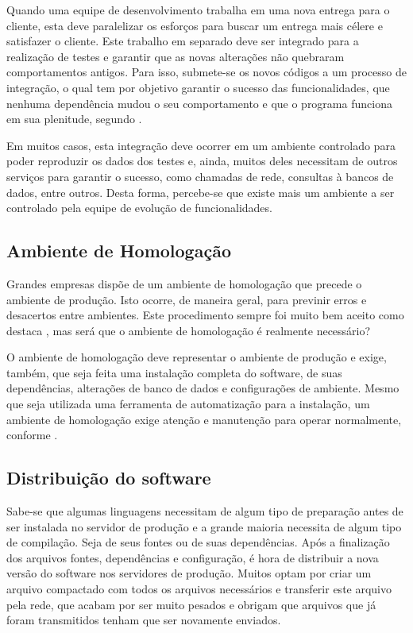\documentclass[
	12pt,				%
	openright,			%
	oneside,			%
	a4paper,			%
	chapter=TITLE,		%
	section=TITLE,		%
	english,			%
	french,				%
	spanish,			%
	brazil				%
	]{abntex2}
\begin{document}
Quando uma equipe de desenvolvimento trabalha em uma nova entrega para o cliente, esta deve paralelizar os esforços para buscar um entrega mais célere e satisfazer o cliente. Este trabalho em separado deve ser integrado para a realização de testes e garantir que as novas alterações não quebraram comportamentos antigos. Para isso, submete-se os novos códigos a um processo de integração, o qual tem por objetivo garantir o sucesso das funcionalidades, que nenhuma dependência mudou o seu comportamento e que o programa funciona em sua plenitude, segundo .

Em muitos casos, esta integração deve ocorrer em um ambiente controlado para poder reproduzir os dados dos testes e, ainda, muitos deles necessitam de outros serviços para garantir o sucesso, como chamadas de rede, consultas à bancos de dados, entre outros. Desta forma, percebe-se que existe mais um ambiente a ser controlado pela equipe de evolução de funcionalidades.

\subsection{Ambiente de Homologação}

Grandes empresas dispõe de um ambiente de homologação que precede o ambiente de produção. Isto ocorre, de maneira geral, para previnir erros e desacertos entre ambientes. Este procedimento sempre foi muito bem aceito como destaca , mas será que o ambiente de homologação é realmente necessário?

O ambiente de homologação deve representar o ambiente de produção e exige, também, que seja feita uma instalação completa do software, de suas dependências, alterações de banco de dados e configurações de ambiente. Mesmo que seja utilizada uma ferramenta de automatização para a instalação, um ambiente de homologação exige atenção e manutenção para operar normalmente, conforme .

\subsection{Distribuição do software}

Sabe-se que algumas linguagens necessitam de algum tipo de preparação antes de ser instalada no servidor de produção e a grande maioria necessita de algum tipo de compilação. Seja de seus fontes ou de suas dependências. Após a finalização dos arquivos fontes, dependências e configuração, é hora de distribuir a nova versão do software nos servidores de produção. Muitos optam por criar um arquivo compactado com todos os arquivos necessários e transferir este arquivo pela rede, que acabam por ser muito pesados e obrigam que arquivos que já foram transmitidos tenham que ser novamente enviados.
\end{document}
